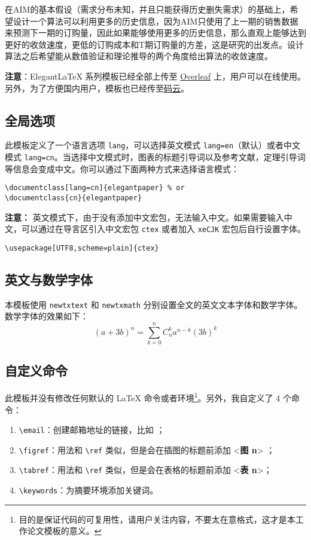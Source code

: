 \documentclass[lang=cn,11pt,a4paper]{elegantpaper}
\begin{document}
在AIM的基本假设（需求分布未知，并且只能获得历史删失需求）的基础上，希望设计一个算法可以利用更多的历史信息，因为AIM只使用了上一期的销售数据来预测下一期的订购量，因此如果能够使用更多的历史信息，那么直观上能够达到更好的收敛速度，更低的订购成本和T期订购量的方差，这是研究的出发点。设计算法之后希望能从数值验证和理论推导的两个角度给出算法的收敛速度。



\textbf{注意}：Elegant\LaTeX{} 系列模板已经全部上传至 \href{https://www.overleaf.com/latex/templates/elegantpaper-template/yzghrqjhmmmr}{Overleaf} 上，用户可以在线使用。另外，为了方便国内用户，模板也已经传至\href{https://gitee.com/ElegantLaTeX/ElegantPaper}{码云}。


\subsection{全局选项}
此模板定义了一个语言选项 \lstinline{lang}，可以选择英文模式 \lstinline{lang=en}（默认）或者中文模式 \lstinline{lang=cn}。当选择中文模式时，图表的标题引导词以及参考文献，定理引导词等信息会变成中文。你可以通过下面两种方式来选择语言模式：
\begin{lstlisting}
\documentclass[lang=cn]{elegantpaper} % or
\documentclass{cn}{elegantpaper} 
\end{lstlisting}

\textbf{注意：} 英文模式下，由于没有添加中文宏包，无法输入中文。如果需要输入中文，可以通过在导言区引入中文宏包 \lstinline{ctex} 或者加入 \lstinline{xeCJK} 宏包后自行设置字体。 
\begin{lstlisting}
\usepackage[UTF8,scheme=plain]{ctex}
\end{lstlisting}

\subsection{英文与数学字体}

本模板使用 \lstinline{newtxtext} 和 \lstinline{newtxmath} 分别设置全文的英文文本字体和数学字体。数学字体的效果如下：
\begin{equation}
(a+3b)^{n} = \sum_{k=0}^{n} C_{n}^{k} a^{n-k} (3b)^k\label{eq:binom}
\end{equation}

\subsection{自定义命令}
此模板并没有修改任何默认的 \LaTeX{} 命令或者环境\footnote{目的是保证代码的可复用性，请用户关注内容，不要太在意格式，这才是本工作论文模板的意义。}。另外，我自定义了 4 个命令：
\begin{enumerate}
  \item \lstinline{\email}：创建邮箱地址的链接，比如 ；
  \item \lstinline{\figref}：用法和 \lstinline{\ref} 类似，但是会在插图的标题前添加 <\textbf{图 n}> ；
  \item \lstinline{\tabref}：用法和 \lstinline{\ref} 类似，但是会在表格的标题前添加 <\textbf{表 n}>；
  \item \lstinline{\keywords}：为摘要环境添加关键词。
\end{enumerate}
\end{document}
